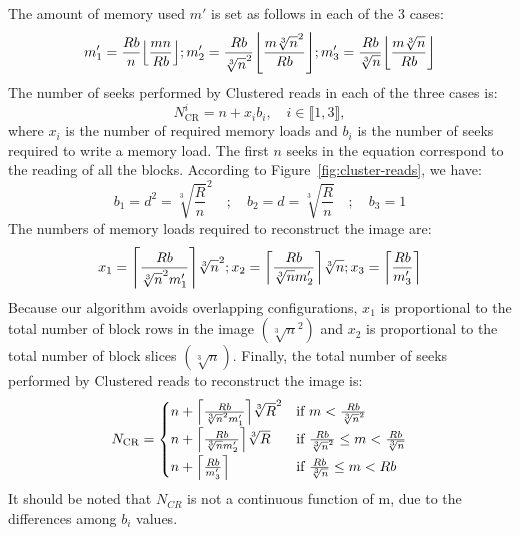 \documentclass[10pt, conference, compsocconf]{IEEEtran}
\DeclarePairedDelimiter{\ceil}{\lceil}{\rceil}
\DeclarePairedDelimiter{\floor}{\lfloor}{\rfloor}
\begin{document}
The amount of memory used $m'$ is set as follows in each of the 3 cases:
\begin{equation*}
  m_1' = \frac{Rb}{n}\floor*{\frac{mn}{Rb}};
  m_2' = \frac{Rb}{\sqrt[3]{n}^2}\floor*{\frac{m\sqrt[3]{n}^2}{Rb}};
  m_3' = \frac{Rb}{\sqrt[3]{n}}\floor*{\frac{m\sqrt[3]{n}}{Rb}}
\end{equation*}
The number of seeks performed by Clustered reads in each of the three cases is:
\begin{equation*}
  N^i_{\mathrm{CR}} = n + x_ib_i, \quad i \in \llbracket 1, 3\rrbracket,
\end{equation*}
where $x_i$ is the number of required memory loads and $b_i$ is the
number of seeks required to write a memory load. The first $n$ seeks
in the equation correspond to the reading of all the blocks. According
to Figure~\ref{fig:cluster-reads}, we have:
\begin{equation*}
  b_1=d^2=\sqrt[3]{\frac{R}{n}}^2 \quad ; \quad b_2=d=\sqrt[3]{\frac{R}{n}} \quad ; \quad b_3=1
\end{equation*}
The
numbers of memory loads required to reconstruct the image are:
\begin{equation*}
  x_1 = \ceil*{\frac{Rb}{\sqrt[3]{n}^2m_1'}}\sqrt[3]{n}^2;
  x_2 = \ceil*{\frac{Rb}{\sqrt[3]{n}m_2'}}\sqrt[3]{n};
  x_3 = \ceil*{\frac{Rb}{m_3'}}
\end{equation*}
Because our algorithm avoids overlapping configurations, $x_1$ is
proportional to the total number of block rows in the image
$\left( \sqrt[3]{n}^2 \right)$ and $x_2$ is proportional to the total number of
block slices $\left( \sqrt[3]{n} \right)$.
Finally, the total number of seeks
performed by Clustered reads to reconstruct the image is:
\begin{equation}
N_\mathrm{CR} =
\begin{cases}
  n + \ceil*{\frac{Rb}{\sqrt[3]{n}^2m_1'}}\sqrt[3]{R}^2     & \text{if } m < \frac{Rb}{\sqrt[3]{n}^2}\\[0.4em]
  n + \ceil*{\frac{Rb}{\sqrt[3]{n}m_2'}}\sqrt[3]{R}        & \text{if } \frac{Rb}{\sqrt[3]{n}^2} \leq m < \frac{Rb}{\sqrt[3]{n}}\\[0.4em]
  n + \ceil*{\frac{Rb}{m_3'}}                              & \text{if } \frac{Rb}{\sqrt[3]{n}} \leq m < Rb
\end{cases} \label{eq:seeks-cluster-reads-1}
\end{equation}
It should be noted that $N_{CR}$ is not a continuous function of m,
due to the differences among $b_i$ values.
\end{document}
